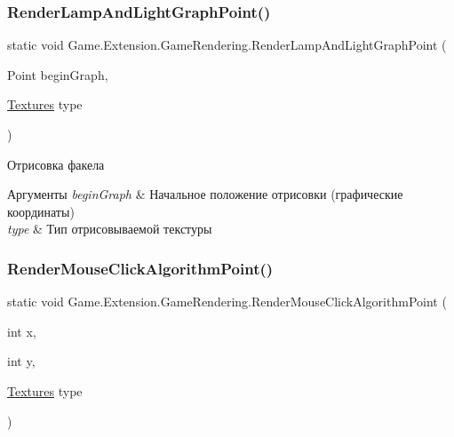 \subsubsection{\texorpdfstring{Render\+Lamp\+And\+Light\+Graph\+Point()}{RenderLampAndLightGraphPoint()}}
{\footnotesize\ttfamily static void Game.\+Extension.\+Game\+Rendering.\+Render\+Lamp\+And\+Light\+Graph\+Point (\begin{DoxyParamCaption}\item[{Point}]{begin\+Graph,  }\item[{\hyperlink{namespace_game_1_1_enums_a2d1ea7762a7b4609383b4b578d1c4a60}{Textures}}]{type }\end{DoxyParamCaption})\hspace{0.3cm}{\ttfamily [static]}}



Отрисовка факела 


\begin{DoxyParams}{Аргументы}
{\em begin\+Graph} & Начальное положение отрисовки (графические координаты)\\
\hline
{\em type} & Тип отрисовываемой текстуры\\
\hline
\end{DoxyParams}
\mbox{\label{class_game_1_1_extension_1_1_game_rendering_af93650c68c4abc9f2c023a62126ed1b8}} 
\subsubsection{\texorpdfstring{Render\+Mouse\+Click\+Algorithm\+Point()}{RenderMouseClickAlgorithmPoint()}}
{\footnotesize\ttfamily static void Game.\+Extension.\+Game\+Rendering.\+Render\+Mouse\+Click\+Algorithm\+Point (\begin{DoxyParamCaption}\item[{int}]{x,  }\item[{int}]{y,  }\item[{\hyperlink{namespace_game_1_1_enums_a2d1ea7762a7b4609383b4b578d1c4a60}{Textures}}]{type }\end{DoxyParamCaption})\hspace{0.3cm}{\ttfamily [static]}}



